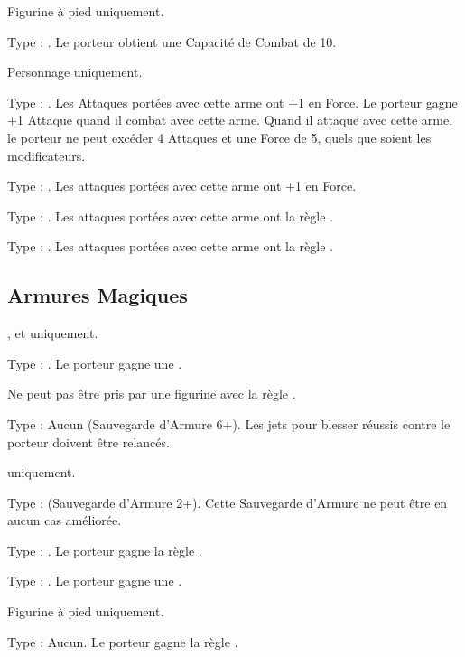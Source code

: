 Figurine à pied uniquement.

Type : \pw{}. Le porteur obtient une Capacité de Combat de 10.

Personnage uniquement.

Type : \hw{}. Les Attaques portées avec cette arme ont +1 en Force. Le porteur gagne +1 Attaque quand il combat avec cette arme. Quand il attaque avec cette arme, le porteur ne peut excéder 4 Attaques et une Force de 5, quels que soient les modificateurs.

Type : \hw{}. Les attaques portées avec cette arme ont +1 en Force.

Type : \lance{}. Les attaques portées avec cette arme ont la règle \flamingattacks{}.

Type : \hw{}. Les attaques portées avec cette arme ont la règle .

\endpricelist

\newpage
\hypertarget{magicalarmour}{\subsection{Armures Magiques}}
\label{magical_armour}

\startpricelist

\infantry{}, \warbeasts{} et \cavalry{} uniquement.

Type : \ha{}. Le porteur gagne une .

Ne peut pas être pris par une figurine avec la règle \toweringpresence{}.

Type : Aucun (Sauvegarde d'Armure 6+). Les jets pour blesser réussis contre le porteur doivent être relancés.

\infantry{} uniquement.

Type : \ha{} (Sauvegarde d'Armure 2+). Cette Sauvegarde d'Armure ne peut être en aucun cas améliorée.

Type : \ha{}. Le porteur gagne la règle \distracting{}.

Type : \ha{}. Le porteur gagne une .

Figurine à pied uniquement.

Type : Aucun. Le porteur gagne la règle .

